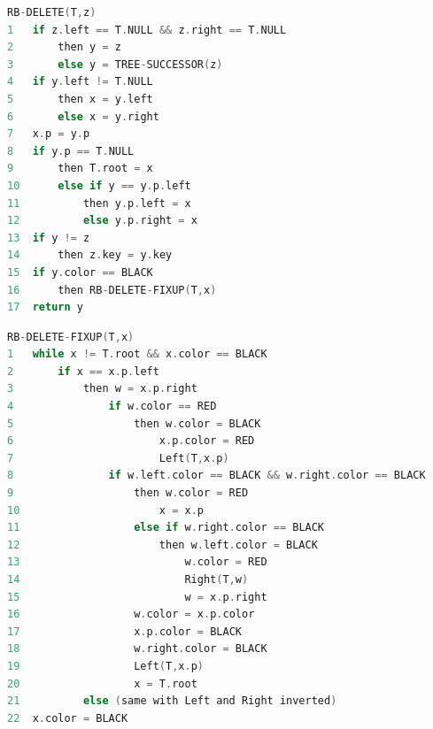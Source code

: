 \newpage
\begin{mdframed}
\begin{lstlisting}[language=C]
RB-DELETE(T,z)
1   if z.left == T.NULL && z.right == T.NULL
2       then y = z
3       else y = TREE-SUCCESSOR(z)
4   if y.left != T.NULL
5       then x = y.left
6       else x = y.right
7   x.p = y.p
8   if y.p == T.NULL
9       then T.root = x
10      else if y == y.p.left
11          then y.p.left = x
12          else y.p.right = x
13  if y != z
14      then z.key = y.key
15  if y.color == BLACK
16      then RB-DELETE-FIXUP(T,x)
17  return y
\end{lstlisting}
\end{mdframed}
\begin{mdframed}
\begin{lstlisting}[language=C]
RB-DELETE-FIXUP(T,x)
1   while x != T.root && x.color == BLACK
2       if x == x.p.left
3           then w = x.p.right
4               if w.color == RED
5                   then w.color = BLACK
6                       x.p.color = RED
7                       Left(T,x.p)
8               if w.left.color == BLACK && w.right.color == BLACK
9                   then w.color = RED
10                      x = x.p
11                  else if w.right.color == BLACK
12                      then w.left.color = BLACK
13                          w.color = RED
14                          Right(T,w)
15                          w = x.p.right    
16                  w.color = x.p.color
17                  x.p.color = BLACK
18                  w.right.color = BLACK
19                  Left(T,x.p)
20                  x = T.root
21          else (same with Left and Right inverted)
22  x.color = BLACK
\end{lstlisting}
\end{mdframed}

\newpage
